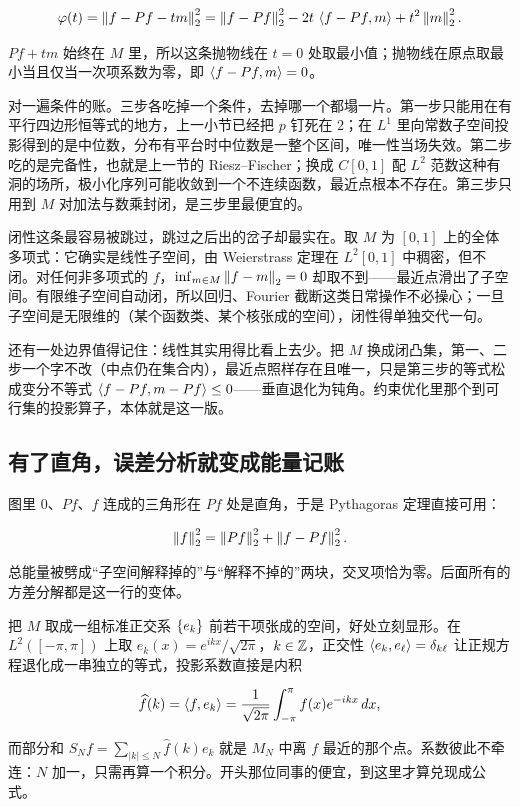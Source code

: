 \[
\varphi(t)=\left\lVert f-Pf-tm\right\rVert_2^2=\left\lVert f-Pf\right\rVert_2^2-2t\,\left\langle f-Pf,m\right\rangle+t^2\left\lVert m\right\rVert_2^2 .
\]

\(Pf+tm\) 始终在 \(M\) 里，所以这条抛物线在 \(t=0\) 处取最小值；抛物线在原点取最小当且仅当一次项系数为零，即 \(\left\langle f-Pf,m\right\rangle=0\)。

对一遍条件的账。三步各吃掉一个条件，去掉哪一个都塌一片。第一步只能用在有平行四边形恒等式的地方，上一小节已经把 \(p\) 钉死在 \(2\)；在 \(L^1\) 里向常数子空间投影得到的是中位数，分布有平台时中位数是一整个区间，唯一性当场失效。第二步吃的是完备性，也就是上一节的 Riesz--Fischer；换成 \(C[0,1]\) 配 \(L^2\) 范数这种有洞的场所，极小化序列可能收敛到一个不连续函数，最近点根本不存在。第三步只用到 \(M\) 对加法与数乘封闭，是三步里最便宜的。

闭性这条最容易被跳过，跳过之后出的岔子却最实在。取 \(M\) 为 \([0,1]\) 上的全体多项式：它确实是线性子空间，由 Weierstrass 定理在 \(L^2[0,1]\) 中稠密，但不闭。对任何非多项式的 \(f\)，\(\inf_{m\in M}\left\lVert f-m\right\rVert_2=0\) 却取不到——最近点滑出了子空间。有限维子空间自动闭，所以回归、Fourier 截断这类日常操作不必操心；一旦子空间是无限维的（某个函数类、某个核张成的空间），闭性得单独交代一句。

还有一处边界值得记住：线性其实用得比看上去少。把 \(M\) 换成闭凸集，第一、二步一个字不改（中点仍在集合内），最近点照样存在且唯一，只是第三步的等式松成变分不等式 \(\left\langle f-Pf,m-Pf\right\rangle\le0\)——垂直退化为钝角。约束优化里那个到可行集的投影算子，本体就是这一版。

\subsection{有了直角，误差分析就变成能量记账}

图里 \(0\)、\(Pf\)、\(f\) 连成的三角形在 \(Pf\) 处是直角，于是 Pythagoras 定理直接可用：

\[
\left\lVert f\right\rVert_2^2=\left\lVert Pf\right\rVert_2^2+\left\lVert f-Pf\right\rVert_2^2 .
\]

总能量被劈成``子空间解释掉的''与``解释不掉的''两块，交叉项恰为零。后面所有的方差分解都是这一行的变体。

把 \(M\) 取成一组标准正交系 \(\left\{e_k\right\}\) 前若干项张成的空间，好处立刻显形。在 \(L^2([-\pi,\pi])\) 上取 \(e_k(x)=e^{ikx}/\sqrt{2\pi}\)，\(k\in\mathbb{Z}\)，正交性 \(\left\langle e_k,e_\ell\right\rangle=\delta_{k\ell}\) 让正规方程退化成一串独立的等式，投影系数直接是内积

\[
\widehat f(k)=\left\langle f,e_k\right\rangle=\frac{1}{\sqrt{2\pi}}\int_{-\pi}^{\pi}f(x)e^{-ikx}\,dx ,
\]

而部分和 \(S_Nf=\sum_{|k|\le N}\widehat f(k)e_k\) 就是 \(M_N\) 中离 \(f\) 最近的那个点。系数彼此不牵连：\(N\) 加一，只需再算一个积分。开头那位同事的便宜，到这里才算兑现成公式。

